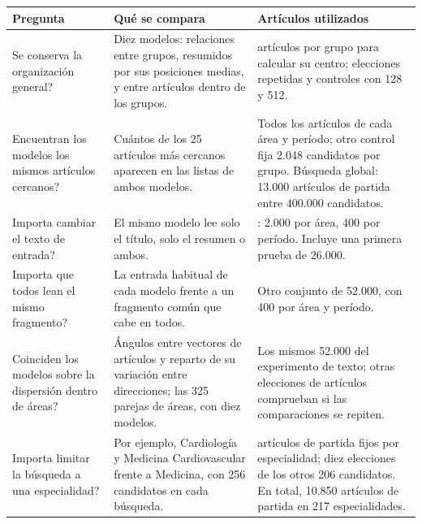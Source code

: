 \begin{table}[!htbp]
\par\noindent\begin{minipage}{\linewidth}
\small
\setlength{\tabcolsep}{4pt}
\renewcommand{\arraystretch}{1.10}
\label{tab:T01}
\begin{tabular}{@{}>{\raggedright\arraybackslash}p{4.0cm}>{\raggedright\arraybackslash}p{5.4cm}>{\raggedright\arraybackslash}p{5.75cm}@{}}
\toprule
\textbf{Pregunta} & \textbf{Qué se compara} & \textbf{Artículos utilizados} \\
\midrule
\textquestiondown{}Se conserva la organización general? & Diez modelos: relaciones entre grupos, resumidos por sus posiciones medias, y entre artículos dentro de los grupos. & 256 artículos por grupo para calcular su centro; elecciones repetidas y controles con 128 y 512. \\
\addlinespace[8pt]
\textquestiondown{}Encuentran los modelos los mismos artículos cercanos? & Cuántos de los 25 artículos más cercanos aparecen en las listas de ambos modelos. & Todos los artículos de cada área y período; otro control fija 2.048 candidatos por grupo. Búsqueda global: 13.000 artículos de partida entre 400.000 candidatos. \\
\addlinespace[8pt]
\textquestiondown{}Importa cambiar el texto de entrada? & El mismo modelo lee solo el título, solo el resumen o ambos. & 52.000: 2.000 por área, 400 por período. Incluye una primera prueba de 26.000. \\
\addlinespace[8pt]
\textquestiondown{}Importa que todos lean el mismo fragmento? & La entrada habitual de cada modelo frente a un fragmento común que cabe en todos. & Otro conjunto de 52.000, con 400 por área y período. \\
\addlinespace[8pt]
\textquestiondown{}Coinciden los modelos sobre la dispersión dentro de áreas? & Ángulos entre vectores de artículos y reparto de su variación entre direcciones; las 325 parejas de áreas, con diez modelos. & Los mismos 52.000 del experimento de texto; otras elecciones de artículos comprueban si las comparaciones se repiten. \\
\addlinespace[8pt]
\textquestiondown{}Importa limitar la búsqueda a una especialidad? & Por ejemplo, Cardiología y Medicina Cardiovascular frente a Medicina, con 256 candidatos en cada búsqueda. & 50 artículos de partida fijos por especialidad; diez elecciones de los otros 206 candidatos. En total, 10.850 artículos de partida en 217 especialidades. \\

\end{tabular}
\end{minipage}
\end{table}
